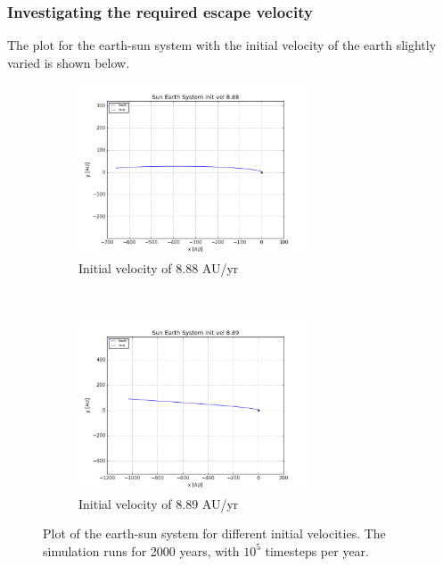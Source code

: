 \documentclass[a4paper, 10pt]{article}
\begin{document}
\subsubsection{Investigating the required escape velocity}
The plot for the earth-sun system with the initial velocity of the earth slightly varied is shown below.
\begin{figure}[!ht]
    \centering
    \begin{subfigure}[H!]{0.5\textwidth}
        \centering
        \includegraphics[height=2.0in]{escape888.png}
        \caption{Initial velocity of 8.88 AU/yr}
    \end{subfigure}%
    ~ 
    \begin{subfigure}[H!]{0.5\textwidth}
        \centering
        \includegraphics[height=2.0in]{escape889.png}
        \caption{Initial velocity of 8.89 AU/yr}
    \end{subfigure}
    \caption{Plot of the earth-sun system for different initial velocities. The simulation runs for 2000 years, with $10^5$ timesteps per year.}\label{fig:escape_vel}
\end{figure}
\newpage
\end{document}
